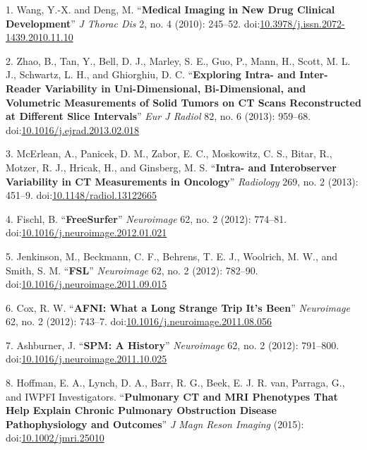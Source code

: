 \documentclass[11pt,]{article}
\begin{document}
\hypertarget{refs}{}
\hypertarget{ref-Wang:2010aa}{}
1. Wang, Y.-X. and Deng, M. ``\textbf{Medical Imaging in New Drug
Clinical Development}'' \emph{J Thorac Dis} 2, no. 4 (2010): 245--52.
doi:\href{https://doi.org/10.3978/j.issn.2072-1439.2010.11.10}{10.3978/j.issn.2072-1439.2010.11.10}

\hypertarget{ref-Zhao:2013aa}{}
2. Zhao, B., Tan, Y., Bell, D. J., Marley, S. E., Guo, P., Mann, H.,
Scott, M. L. J., Schwartz, L. H., and Ghiorghiu, D. C.
``\textbf{Exploring Intra- and Inter-Reader Variability in
Uni-Dimensional, Bi-Dimensional, and Volumetric Measurements of Solid
Tumors on CT Scans Reconstructed at Different Slice Intervals}''
\emph{Eur J Radiol} 82, no. 6 (2013): 959--68.
doi:\href{https://doi.org/10.1016/j.ejrad.2013.02.018}{10.1016/j.ejrad.2013.02.018}

\hypertarget{ref-McErlean:2013aa}{}
3. McErlean, A., Panicek, D. M., Zabor, E. C., Moskowitz, C. S., Bitar,
R., Motzer, R. J., Hricak, H., and Ginsberg, M. S. ``\textbf{Intra- and
Interobserver Variability in CT Measurements in Oncology}''
\emph{Radiology} 269, no. 2 (2013): 451--9.
doi:\href{https://doi.org/10.1148/radiol.13122665}{10.1148/radiol.13122665}

\hypertarget{ref-Fischl:2012aa}{}
4. Fischl, B. ``\textbf{FreeSurfer}'' \emph{Neuroimage} 62, no. 2
(2012): 774--81.
doi:\href{https://doi.org/10.1016/j.neuroimage.2012.01.021}{10.1016/j.neuroimage.2012.01.021}

\hypertarget{ref-Jenkinson:2012aa}{}
5. Jenkinson, M., Beckmann, C. F., Behrens, T. E. J., Woolrich, M. W.,
and Smith, S. M. ``\textbf{FSL}'' \emph{Neuroimage} 62, no. 2 (2012):
782--90.
doi:\href{https://doi.org/10.1016/j.neuroimage.2011.09.015}{10.1016/j.neuroimage.2011.09.015}

\hypertarget{ref-Cox:2012aa}{}
6. Cox, R. W. ``\textbf{AFNI: What a Long Strange Trip It's Been}''
\emph{Neuroimage} 62, no. 2 (2012): 743--7.
doi:\href{https://doi.org/10.1016/j.neuroimage.2011.08.056}{10.1016/j.neuroimage.2011.08.056}

\hypertarget{ref-Ashburner:2012aa}{}
7. Ashburner, J. ``\textbf{SPM: A History}'' \emph{Neuroimage} 62, no. 2
(2012): 791--800.
doi:\href{https://doi.org/10.1016/j.neuroimage.2011.10.025}{10.1016/j.neuroimage.2011.10.025}

\hypertarget{ref-Hoffman:2015aa}{}
8. Hoffman, E. A., Lynch, D. A., Barr, R. G., Beek, E. J. R. van,
Parraga, G., and IWPFI Investigators. ``\textbf{Pulmonary CT and MRI
Phenotypes That Help Explain Chronic Pulmonary Obstruction Disease
Pathophysiology and Outcomes}'' \emph{J Magn Reson Imaging} (2015):
doi:\href{https://doi.org/10.1002/jmri.25010}{10.1002/jmri.25010}
\end{document}
